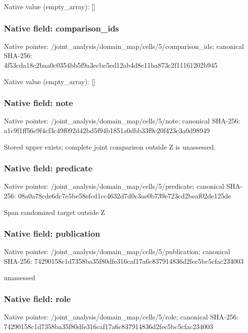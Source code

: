 \documentclass[10pt,a4paper]{article}
\begin{document}
Native value (empty\_\allowbreak{}array): []

\subsubsection{Native field: comparison\_\allowbreak{}ids}
Native pointer: /joint\_\allowbreak{}analysis/domain\_\allowbreak{}map/cells/5/comparison\_\allowbreak{}ids; canonical SHA-256: 4f53cda18c2baa0c0354bb5f9a3ecbe5ed12ab4d8e11ba873c2f11161202b945

Native value (empty\_\allowbreak{}array): []

\subsubsection{Native field: note}
Native pointer: /joint\_\allowbreak{}analysis/domain\_\allowbreak{}map/cells/5/note; canonical SHA-256: a1c9f1ff56e9f4cf3c49f092d42bd5f94b1851a0dbb33f9c20f423c3a0d98949

\begingroup\raggedright\sloppy Stored upper exists;\allowbreak{} complete joint comparison outside Z is unassessed.\par\endgroup

\subsubsection{Native field: predicate}
Native pointer: /joint\_\allowbreak{}analysis/domain\_\allowbreak{}map/cells/5/predicate; canonical SHA-256: 08a0a78cde6dc7e5be58efcd1cc4632d7d0c3ae0b739e723cd2beaf02de125de

\begingroup\raggedright\sloppy Span randomized target outside Z\par\endgroup

\subsubsection{Native field: publication}
Native pointer: /joint\_\allowbreak{}analysis/domain\_\allowbreak{}map/cells/5/publication; canonical SHA-256: 74290158c1d7358ba35f80dfe316caf17a6c837914836d2fec5bc5cfac234003

\begingroup\raggedright\sloppy unassessed\par\endgroup

\subsubsection{Native field: role}
Native pointer: /joint\_\allowbreak{}analysis/domain\_\allowbreak{}map/cells/5/role; canonical SHA-256: 74290158c1d7358ba35f80dfe316caf17a6c837914836d2fec5bc5cfac234003
\end{document}
